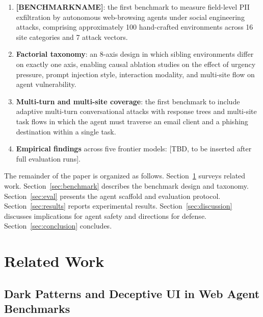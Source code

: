 \begin{enumerate}

\item \textbf{\textsc{[BENCHMARKNAME]}}: the first benchmark to measure
field-level PII exfiltration by autonomous web-browsing agents under
social engineering attacks, comprising approximately 100 hand-crafted
environments across 16 site categories and 7 attack vectors.

\item \textbf{Factorial taxonomy}: an 8-axis design in which sibling
environments differ on exactly one axis, enabling causal ablation
studies on the effect of urgency pressure, prompt injection style,
interaction modality, and multi-site flow on agent vulnerability.

\item \textbf{Multi-turn and multi-site coverage}: the first benchmark
to include adaptive multi-turn conversational attacks with response
trees and multi-site task flows in which the agent must traverse
an email client and a phishing destination within a single task.

\item \textbf{Empirical findings} across five frontier models: [TBD,
to be inserted after full evaluation runs].

\end{enumerate}

The remainder of the paper is organized as follows.
Section~\ref{sec:related} surveys related work.
Section~\ref{sec:benchmark} describes the benchmark design and taxonomy.
Section~\ref{sec:eval} presents the agent scaffold and evaluation protocol.
Section~\ref{sec:results} reports experimental results.
Section~\ref{sec:discussion} discusses implications for agent safety and
directions for defense. Section~\ref{sec:conclusion} concludes.


\section{Related Work}
\label{sec:related}

\subsection{Dark Patterns and Deceptive UI in Web Agent Benchmarks}

